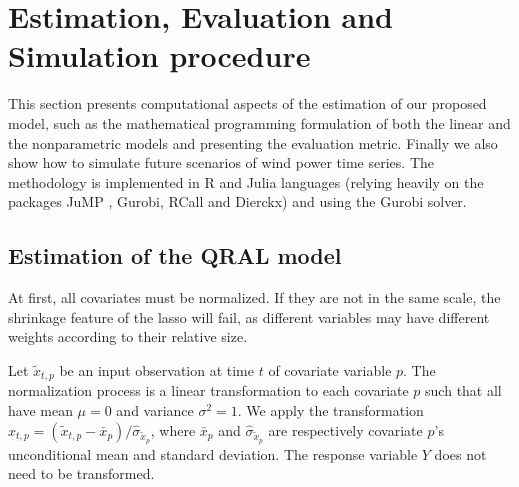 \section{Estimation, Evaluation and Simulation procedure} \label{sec:estimation-evaluation-simulation}

This section presents computational aspects of the estimation of our proposed model, such as the mathematical programming formulation of both the linear and the nonparametric models and presenting the evaluation metric. 
Finally we also show how to simulate future scenarios of wind power time series.
The methodology is implemented in R \cite{rlanguage2008} and Julia \cite{bezanson2012julia} languages (relying heavily on the packages JuMP \cite{DunningHuchetteLubin2017}, Gurobi, RCall and Dierckx) and using the Gurobi solver. 



\subsection{Estimation of the QRAL model} \label{sec:qral-estimation}

At first, all covariates must be normalized. 
If they are not in the same scale, the shrinkage feature of the lasso will fail, as different variables may have different weights according to their relative size.

Let $\tilde x_{t,p}$ be an input observation at time $t$ of covariate variable $p$.
The normalization process is a linear transformation to each covariate $p$ such that all have mean $\mu = 0$ and variance $\sigma^2 = 1$. 
We apply the transformation ${x}_{t,p} = (\tilde x_{t,p} - \bar{x}_{p}) / \hat\sigma_{\tilde x_{p}}$, where $\bar{x}_{p}$ and $\hat{\sigma}_{\tilde x_{p}}$ are respectively covariate $p$'s unconditional mean and standard deviation. The response variable $Y$ does not need to be transformed.

